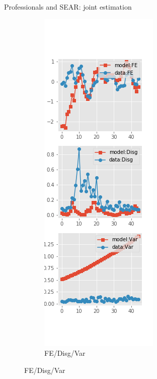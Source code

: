 \documentclass{beamer}
\begin{document}
\begin{frame}{Professionals and SEAR: joint estimation}
\begin{figure}[ht]
\begin{subfigure}[b]{0.2\textwidth}
		\end{subfigure}
		\hfill
		\begin{subfigure}[b]{0.2\textwidth}
			\caption{FE/Disg/Var}
			\includegraphics[width=\textwidth, height = 0.8\textheight]{figuresDraft/spf_se_est_joint_diag3.png}
		\end{subfigure}
		\hfill
	\end{figure}
\end{frame}
\end{document}
